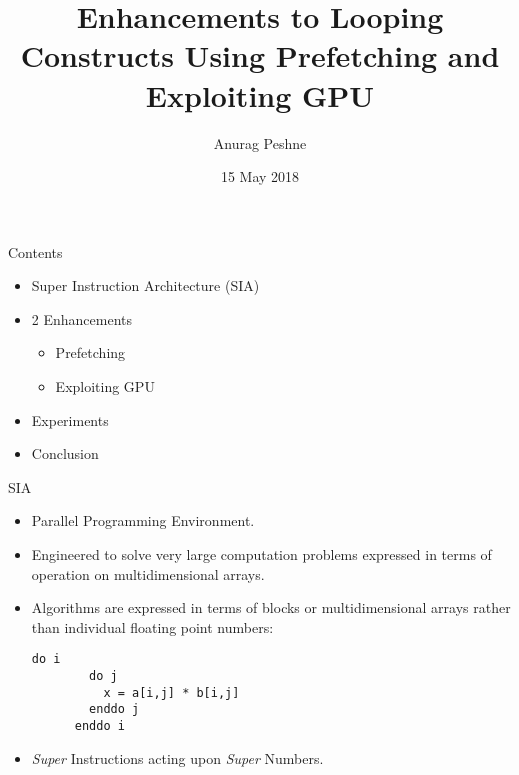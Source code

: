 \documentclass{beamer}
\title{Enhancements to Looping Constructs Using Prefetching and Exploiting GPU}
\author{Anurag Peshne}
\date{15 May 2018}
\begin{document}
\begin{frame}
  \titlepage
\end{frame}

\begin{frame}{Contents}
  \pause
  \begin{itemize}
  \item Super Instruction Architecture (SIA)
    \pause
  \item 2 Enhancements
    \pause
    \begin{itemize}
    \item Prefetching
      \pause
    \item Exploiting GPU
      \pause
    \end{itemize}
  \item Experiments
    \pause
  \item Conclusion
  \end{itemize}
\end{frame}

\begin{frame}[fragile]{SIA}
  \begin{itemize}
    \pause
  \item Parallel Programming Environment.
    \pause
  \item Engineered to solve very large computation problems expressed in terms of
    operation on multidimensional arrays.
    \pause
  \item Algorithms are expressed in terms of blocks or multidimensional arrays
    rather than individual floating point numbers:
    \begin{lstlisting}[]
      do i
        do j
          x = a[i,j] * b[i,j]
        enddo j
      enddo i
    \end{lstlisting}
    \pause
  \item \textit{Super} Instructions acting upon \textit{Super} Numbers.
  \end{itemize}
\end{frame}
\end{document}

